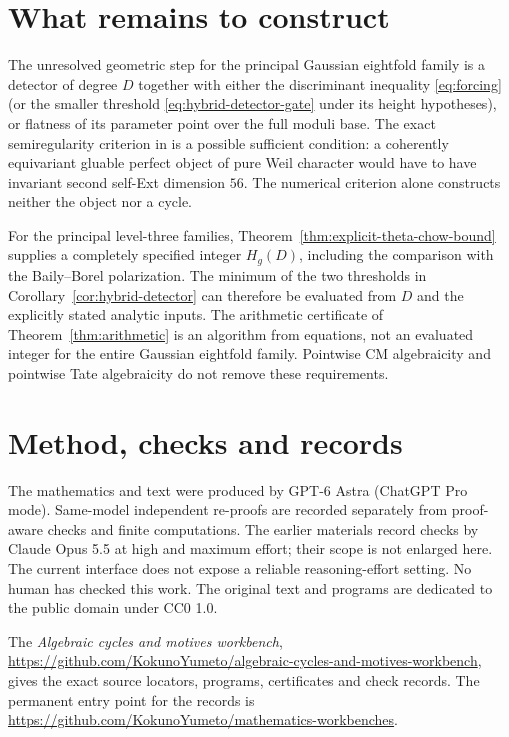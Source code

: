 \documentclass[11pt]{article}
\theoremstyle{definition}
\theoremstyle{remark}
\newcommand{\workbenchurl}{https://github.com/KokunoYumeto/algebraic-cycles-and-motives-workbench}
\newcommand{\recordurl}{https://github.com/KokunoYumeto/mathematics-workbenches}
\begin{document}
\section{What remains to construct}

The unresolved geometric step for the principal Gaussian
eightfold family is a detector of degree $D$ together with
either the discriminant inequality \eqref{eq:forcing} (or the
smaller threshold \eqref{eq:hybrid-detector-gate} under its height
hypotheses), or flatness of its parameter point over the full moduli
base.
The exact semiregularity criterion in \cite{Bounded} is a
possible sufficient condition: a coherently equivariant gluable
perfect object of pure Weil character would have to have
invariant second self-Ext dimension $56$. The numerical
criterion alone constructs neither the object nor a cycle.

For the principal level-three families,
Theorem~\ref{thm:explicit-theta-chow-bound} supplies a completely
specified integer $H_g(D)$, including the comparison with the
Baily--Borel polarization.  The minimum of the two thresholds in
Corollary~\ref{cor:hybrid-detector} can therefore be evaluated from
$D$ and the explicitly stated analytic inputs.
The arithmetic certificate of
Theorem~\ref{thm:arithmetic} is an algorithm from equations,
not an evaluated integer for the entire Gaussian eightfold
family. Pointwise CM algebraicity and pointwise Tate algebraicity
do not remove these requirements.

\section*{Method, checks and records}
The mathematics and text were produced by GPT-6 Astra (ChatGPT
Pro mode). Same-model independent re-proofs are recorded separately
from proof-aware checks and finite computations. The earlier
materials record checks by Claude Opus 5.5 at high and maximum
effort; their scope is not enlarged here. The current interface
does not expose a reliable reasoning-effort setting. No human
has checked this work. The original text and programs are
dedicated to the public domain under CC0 1.0.

The \emph{Algebraic cycles and motives workbench},
\url{\workbenchurl}, gives the exact source locators, programs,
certificates and check records. The permanent entry point for
the records is \url{\recordurl}.
\end{document}

